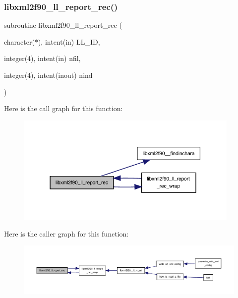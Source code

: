 \subsubsection{\texorpdfstring{libxml2f90\+\_\+ll\+\_\+report\+\_\+rec()}{libxml2f90\_ll\_report\_rec()}}
{\footnotesize\ttfamily subroutine libxml2f90\+\_\+ll\+\_\+report\+\_\+rec (\begin{DoxyParamCaption}\item[{character($\ast$), intent(in)}]{L\+L\+\_\+\+ID,  }\item[{integer(4), intent(in)}]{nfil,  }\item[{integer(4), intent(inout)}]{nind }\end{DoxyParamCaption})}

Here is the call graph for this function\+:
\nopagebreak
\begin{figure}[H]
\begin{center}
\leavevmode
\includegraphics[width=307pt]{libxml2f90_8f90__pp_8f90_a5ddfde66a72fddf024606b83f50ecc3a_cgraph}
\end{center}
\end{figure}
Here is the caller graph for this function\+:
\nopagebreak
\begin{figure}[H]
\begin{center}
\leavevmode
\includegraphics[width=350pt]{libxml2f90_8f90__pp_8f90_a5ddfde66a72fddf024606b83f50ecc3a_icgraph}
\end{center}
\end{figure}
\mbox{\label{libxml2f90_8f90__pp_8f90_aab03f23626a21bebdc849515ddbb2a84}} 
